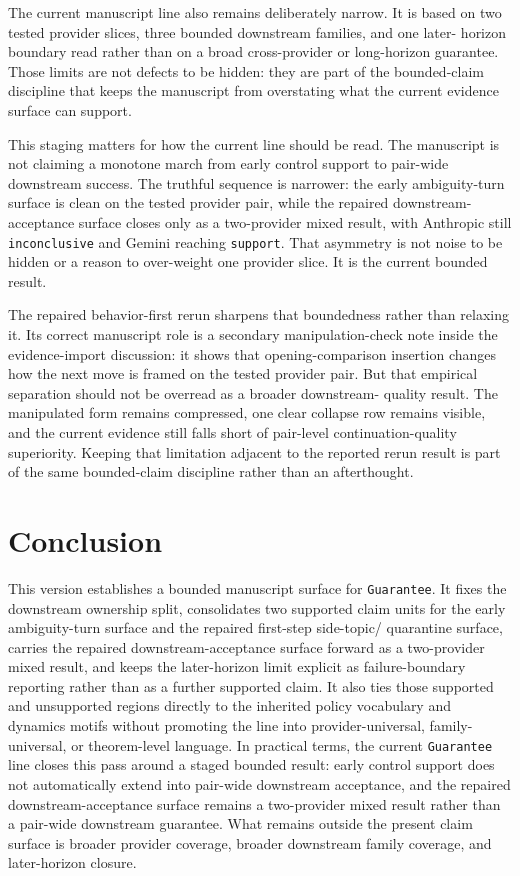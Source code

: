 \documentclass[11pt]{article}
\begin{document}
The current manuscript line also remains deliberately narrow. It is based on
two tested provider slices, three bounded downstream families, and one later-
horizon boundary read rather than on a broad cross-provider or long-horizon
guarantee. Those limits are not defects to be hidden: they are part of the
bounded-claim discipline that keeps the manuscript from overstating what the
current evidence surface can support.

This staging matters for how the current line should be read. The manuscript is
not claiming a monotone march from early control support to pair-wide
downstream success. The truthful sequence is narrower: the early ambiguity-turn
surface is clean on the tested provider pair, while the repaired downstream-
acceptance surface closes only as a two-provider mixed result, with Anthropic
still \texttt{inconclusive} and Gemini reaching \texttt{support}. That
asymmetry is not noise to be hidden or a reason to over-weight one provider
slice. It is the current bounded result.

The repaired behavior-first rerun sharpens that boundedness rather than
relaxing it. Its correct manuscript role is a secondary manipulation-check note
inside the evidence-import discussion: it shows that opening-comparison
insertion changes how the next move is framed on the tested provider pair. But
that empirical separation should not be overread as a broader downstream-
quality result. The manipulated form remains compressed, one clear collapse row
remains visible, and the current evidence still falls short of pair-level
continuation-quality superiority. Keeping that limitation adjacent to the
reported rerun result is part of the same bounded-claim discipline rather than
an afterthought.

\section{Conclusion}

This version establishes a bounded manuscript surface for \texttt{Guarantee}.
It fixes the downstream ownership split, consolidates two supported claim units
for the early ambiguity-turn surface and the repaired first-step side-topic/
quarantine surface, carries the repaired downstream-acceptance surface forward
as a two-provider mixed result, and keeps the later-horizon limit explicit as
failure-boundary reporting rather than as a further supported claim. It also
ties those supported and unsupported regions directly to the inherited policy
vocabulary and dynamics motifs without promoting the line into
provider-universal, family-universal, or theorem-level language. In practical
terms, the current \texttt{Guarantee} line closes this pass around a staged
bounded result: early control support does not automatically extend into
pair-wide downstream acceptance, and the repaired downstream-acceptance surface
remains a two-provider mixed result rather than a pair-wide downstream
guarantee. What remains outside the present claim surface is broader provider
coverage, broader downstream family coverage, and later-horizon closure.
\end{document}
